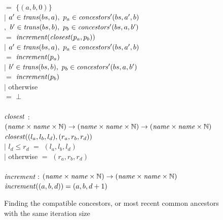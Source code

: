 \begin{figure}
\begin{tabbing}
        \>     \>                      \> $=$ \> $\{(a, b, 0)\}$ \\
        \> $|$ \> $a' \in \mathit{trans}(bs,a),~ p_a \in \mathit{concestors}'(bs,a',b)$ \\
        \> $,$ \> $b' \in \mathit{trans}(bs,b),~ p_b \in \mathit{concestors}'(bs,a,b')$ \\
        \>     \>                      \> $=$ \> $\mathit{increment}(\mathit{closest}(p_a, p_b))$ \\
        \> $|$ \> $a' \in \mathit{trans}(bs,a),~ p_a \in \mathit{concestors}'(bs,a',b)$ \\
        \>     \>                      \> $=$ \> $\mathit{increment}(p_a)$ \\
        \> $|$ \> $b' \in \mathit{trans}(bs,b),~ p_b \in \mathit{concestors}'(bs,a,b')$ \\
        \>     \>                      \> $=$ \> $\mathit{increment}(p_b)$ \\
        \> $|$ \> otherwise            \\
        \>     \>                      \> $=$    \> $\bot$
\\
\\
$\mathit{closest}$ \> $:$ \> $(\mathit{name} \times \mathit{name} \times \mathbb{N}) \to (\mathit{name} \times \mathit{name} \times \mathbb{N}) \to (\mathit{name} \times \mathit{name} \times \mathbb{N})$ \\
$\mathit{closest}((l_a,l_b,l_d), (r_a,r_b,r_d))$ \\
        \> $|$ \> $l_d \le r_d$ \> \> \> $=$ \> $(l_a,l_b,l_d)$ \\
        \> $|$ \> otherwise     \> \> \> $=$ \> $(r_a,r_b,r_d)$ \\
\\
$\mathit{increment} :$ \> \> $(\mathit{name} \times \mathit{name} \times \mathbb{N}) \to (\mathit{name} \times \mathit{name} \times \mathbb{N})$ \\
$\mathit{increment}((a,b,d)) = (a,b,d+1)$ \\
\end{tabbing}

\caption{Finding the compatible concestors, or most recent common ancestors with the same iteration size}
\label{fig:clustering:concestors}
\end{figure}

